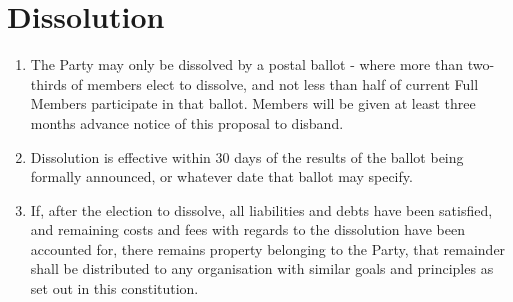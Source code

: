 \documentclass[a4paper,titlepage,8.5pt]{article}
\begin{document}
\section{Dissolution}

\begin{enumerate}
\item The Party may only be dissolved by a postal ballot - where more than two-thirds of members elect to dissolve, and not less than half of current Full Members participate in that ballot. Members will be given at least three months advance notice of this proposal to disband.
\item Dissolution is effective within 30 days of the results of the ballot being formally announced, or whatever date that ballot may specify.
\item If, after the election to dissolve, all liabilities and debts have been satisfied, and remaining costs and fees with regards to the dissolution have been accounted for, there remains property belonging to the Party, that remainder shall be distributed to any organisation with similar goals and principles as set out in this constitution.
\end{enumerate}
\end{document}
